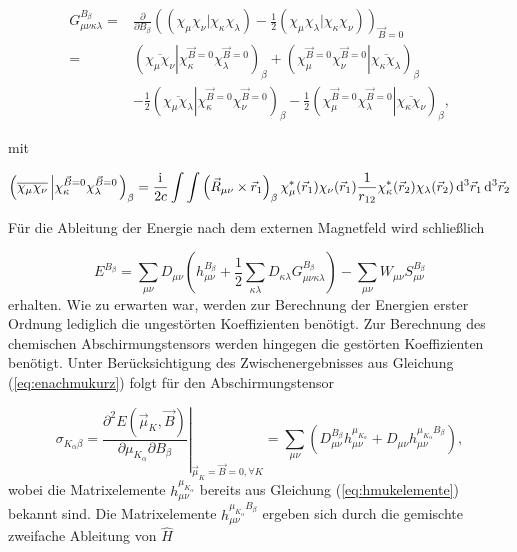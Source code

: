  	 \begin{equation}
  	 \begin{aligned}
  	 G_{\mu\nu\kappa\lambda}^{B_\beta}=&\frac{\partial}{\partial B_\beta}\left((\chi_\mu\chi_\nu\vert\chi_\kappa\chi_\lambda)-\frac{1}{2}(\chi_\mu\chi_\lambda\vert\chi_\kappa\chi_\nu)\right)_{\vec{B}=0}\\
  	 =&\left(\overline{\chi_\mu\chi_\nu}\left\vert\chi_\kappa^{\vec{B}=0}\chi_\lambda^{\vec{B}=0}\right.\right)_\beta
  	 +\left(\left.\chi_\mu^{\vec{B}=0}\chi_\nu^{\vec{B}=0}\right\vert\overline{\chi_\kappa\chi_\lambda}\right)_\beta\\
  	 &-\frac{1}{2}\left(\overline{\chi_\mu\chi_\lambda}\left\vert\chi_\kappa^{\vec{B}=0}\chi_\nu^{\vec{B}=0}\right.\right)_\beta
  	 -\frac{1}{2}\left(\left.\chi_\mu^{\vec{B}=0}\chi_\lambda^{\vec{B}=0}\right\vert\overline{\chi_\kappa\chi_\nu}\right)_\beta,
  	 \end{aligned}
     \end{equation}  	  
	
	mit
	
	\begin{equation}
	\left(\overline{\chi_\mu\chi_\nu}\left\vert\chi_\kappa^{\vec{B}=0}\chi_\lambda^{\vec{B}=0}\right.\right)_\beta=\frac{\mathrm{i}\mkern1mu}{2c}\int\int\left(\vec{R}_{\mu\nu}\times\vec{r}_1\right)_\beta\chi_\mu^*(\vec{r}_1)\chi_\nu(\vec{r}_1)\frac{1}{r_{12}}\chi_\kappa^*(\vec{r}_2)\chi_\lambda(\vec{r}_2)\mathop{}\!\mathrm{d^3} \vec{r}_1 \mathop{}\!\mathrm{d^3} \vec{r}_2\\
	\end{equation}
     
    Für die Ableitung der Energie nach dem externen Magnetfeld wird schließlich
    
    \begin{equation}
    E^{B_\beta}=\sum_{\mu\nu}D_{\mu\nu}\left(h_{\mu\nu}^{B_\beta}+\frac{1}{2}\sum_{\kappa\lambda}D_{\kappa\lambda}G_{\mu\nu\kappa\lambda}^{B_\beta}\right)-\sum_{\mu\nu}W_{\mu\nu}S_{\mu\nu}^{B_\beta}
    \end{equation}
    erhalten. Wie zu erwarten war, werden zur Berechnung der Energien erster Ordnung lediglich die ungestörten Koeffizienten benötigt. Zur Berechnung des chemischen Abschirmungstensors werden hingegen die gestörten Koeffizienten benötigt. Unter Berücksichtigung des Zwischenergebnisses aus Gleichung (\ref{eq:enachmukurz}) folgt für den Abschirmungstensor
    
    \begin{equation}
    \sigma_{K_\alpha\beta}=\left.\frac{\partial^2 E(\vec{\mu}_K,\vec{B})}{\partial \mu_{K_\alpha}\partial B_\beta}\right|_{\vec{\mu}_K=\vec{B}=0,\forall K}=\sum_{\mu\nu}\left(D_{\mu\nu}^{B_\beta}h_{\mu\nu}^{\mu_{K_\alpha}}+D_{\mu\nu}h_{\mu\nu}^{\mu_{K_\alpha}B_\beta}\right),
    \end{equation}
    wobei die Matrixelemente $h_{\mu\nu}^{\mu_{K_\alpha}}$ bereits aus Gleichung (\ref{eq:hmukelemente}) bekannt sind. Die Matrixelemente $h_{\mu\nu}^{\mu_{K_\alpha}B_\beta}$ ergeben sich durch die gemischte zweifache Ableitung von $\hat{H}$
    
